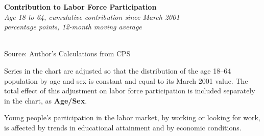 \documentclass{report}
\makeatletter
\newcommand{\tbllink}[1]{\href{https://raw.githubusercontent.com/bdecon/US-chartbook/master/chartbook/data/#1}{\faTable}}
\newcommand*\short[1]{\expandafter\@gobbletwo\number\numexpr#1\relax}
\newcommand{\absnode}[3]{\node[below right, align=left] at (axis cs: #1,#2) {#3};}
\newcommand{\dateaxisticks}{
		date coordinates in=x, axis line style={draw=none},
		xmax={2023-02-15},
		max space between ticks=40,	    
		xtick={{1990-01-01}, {1992-01-01}, {1994-01-01}, 
			{1996-01-01}, {1998-01-01}, {2000-01-01}, 
			{2002-01-01}, {2004-01-01}, {2006-01-01},
			{2008-01-01}, {2010-01-01}, {2012-01-01}, {2014-01-01},
		    {2016-01-01}, {2018-01-01}, {2020-01-01}, {2022-01-01}, 
		    {2024-01-01}, {2026-01-01}},
		minor xtick={{1989-01-01}, {1991-01-01}, {1993-01-01},
			{1995-01-01}, {1997-01-01}, {1999-01-01}, 
			{2001-01-01}, {2003-01-01}, {2005-01-01}, {2007-01-01},
		    {2009-01-01}, {2011-01-01}, {2013-01-01}, {2015-01-01},
		    {2017-01-01}, {2019-01-01}, {2021-01-01}, {2023-01-01}, 
		    {2025-01-01}, {2027-01-01}},
		enlarge y limits={0.06}, enlarge x limits={0.01},
		}
\newcommand{\bbar}[2]{extra #1 ticks = {{#2}}, extra #1 tick labels = ,
		extra #1 tick style = {grid=major, grid style={thick, black!25}},}
\newcommand{\stdline}[4]{\addplot[very thick, no markers, color=#1] 
		table [x=#2, y=#3, col sep=comma] {#4};	}
\newcommand{\thickline}[4]{\addplot[ultra thick, no markers, color=#1] 
		table [x=#2, y=#3, col sep=comma] {#4};	}
\newcommand{\rebars}{
		\fill[color=black!10] (axis cs:{2007-12-01},\pgfkeysvalueof{/pgfplots/ymin}) rectangle 
			(axis cs:{2009-07-01}, \pgfkeysvalueof{/pgfplots/ymax});
		\fill[color=black!10] (axis cs:{2001-03-01},\pgfkeysvalueof{/pgfplots/ymin}) rectangle 
			(axis cs:{2001-11-01}, \pgfkeysvalueof{/pgfplots/ymax});
		\fill[color=black!10] (axis cs:{2020-02-01},\pgfkeysvalueof{/pgfplots/ymin}) rectangle 
			(axis cs:{2020-05-01}, \pgfkeysvalueof{/pgfplots/ymax});}
\makeatother
\begin{document}
{\begin{minipage}{0.29\textwidth}
\small  
\end{minipage} \hspace{5mm}
\begin{minipage}{0.42\textwidth}
\normalsize \textbf{Contribution to Labor Force Participation}\\
\footnotesize{\textit{Age 18 to 64, cumulative contribution since March 2001}}\\
\footnotesize{\textit{percentage points, 12-month moving average}}\\
\hspace*{-3mm} \\
\footnotesize{Source: Author's Calculations from CPS} \hfill \tbllink{nilf.csv}

\footnotesize Series in the chart are adjusted so that the distribution of the age 18--64 population by age and sex is constant and equal to its March 2001 value. The total effect of this adjustment on labor force participation is included separately in the chart, as \color{violet!80!purple}\textbf{Age/Sex}.
\end{minipage}
\newpage
\begin{minipage}{0.76\textwidth}
\small Young people's participation in the labor market, by working or looking for work, is affected by trends in educational attainment and by economic conditions. 
\vspace{2mm}


\end{minipage}}
\end{document}
